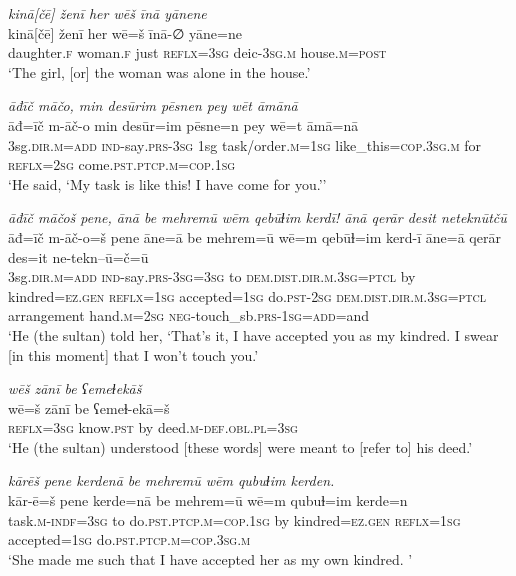 \ea \label{ŽH.74}
\textit{kinā[čē] ženī her wēš īnā yānene} \\ 
\gll kinā[čē] ženī her wē=š īnā-∅ yāne=ne \\ 
 daughter\textsc{\textsc{.f}} woman\textsc{\textsc{.f}} just \textsc{reflx}\textsc{=3sg} deic\textsc{-3sg}\textsc{.m} house\textsc{.m}\textsc{=\textsc{post}} \\ 
\glt `The girl, [or] the woman was alone in the house.'
\z 
 
\ea \label{ŽH.78}
\textit{āđīč māčo, min desūrim pēsnen pey wēt āmānā} \\ 
\gll āđ=īč m-āč-o min desūr=im pēsne=n pey wē=t āmā=nā \\ 
 3sg\textsc{.dir}\textsc{.m}\textsc{=add} \textsc{ind-}say\textsc{.prs}\textsc{-3sg} 1sg task/order\textsc{.m}\textsc{=1sg} like\_this\textsc{=cop}\textsc{.3sg}\textsc{.m} for \textsc{reflx}\textsc{=\textsc{2sg}} come\textsc{.pst}\textsc{.ptcp}\textsc{.m}\textsc{=cop}\textsc{.1sg} \\ 
\glt `He said, ‘My task is like this! I have come for you.’'
\z 
 
\ea \label{ŽH.103}
\textit{āđīč māčoš pene, ānā be mehremū wēm qebūɫim kerdī! ānā qerār desit neteknūtčū} \\ 
\gll āđ=īč m-āč-o=š pene āne=ā be mehrem=ū wē=m qebūɫ=im kerd-ī āne=ā qerār des=it ne-tekn--ū=č=ū \\ 
 3sg\textsc{.dir}\textsc{.m}\textsc{=add} \textsc{ind-}say\textsc{.prs}\textsc{-3sg}\textsc{=3sg} to \textsc{dem.dist}\textsc{.dir}\textsc{.m}\textsc{.3sg}=\textsc{ptcl} by kindred\textsc{=ez}\textsc{.gen} \textsc{reflx}\textsc{=1sg} accepted\textsc{=1sg} do\textsc{.pst}-\textsc{2sg} \textsc{dem.dist}\textsc{.dir}\textsc{.m}\textsc{.3sg}=\textsc{ptcl} arrangement hand\textsc{.m}\textsc{=\textsc{2sg}} \textsc{neg-}touch\_sb\textsc{.prs}\textsc{-1sg}\textsc{=add}=and \\ 
\glt `He (the sultan) told her, ‘That’s it, I have accepted you as my kindred. I swear [in this moment] that I won’t touch you.'
\z 
 
\ea \label{ŽH.115}
\textit{wēš zānī be ʕemeɫekāš} \\ 
\gll wē=š zānī be ʕemeɫ-ekā=š \\ 
 \textsc{reflx}\textsc{=3sg} know\textsc{.pst} by deed\textsc{.m}\textsc{-def}\textsc{.obl}\textsc{.pl}\textsc{=3sg} \\ 
\glt `He (the sultan) understood [these words] were meant to [refer to] his deed.'
\z 
 
\ea \label{ŽH.117}
\textit{kārēš pene kerdenā be mehremū wēm qubuɫim kerden.} \\ 
\gll kār-ē=š pene kerde=nā be mehrem=ū wē=m qubuɫ=im kerde=n \\ 
 task\textsc{.m}\textsc{-indf}\textsc{=3sg} to do\textsc{.pst}\textsc{.ptcp}\textsc{.m}\textsc{=cop}\textsc{.1sg} by kindred\textsc{=ez}\textsc{.gen} \textsc{reflx}\textsc{=1sg} accepted\textsc{=1sg} do\textsc{.pst}\textsc{.ptcp}\textsc{.m}\textsc{=cop}\textsc{.3sg}\textsc{.m} \\ 
\glt `She made  me such that I have accepted her as my own kindred. '
\z 
 
